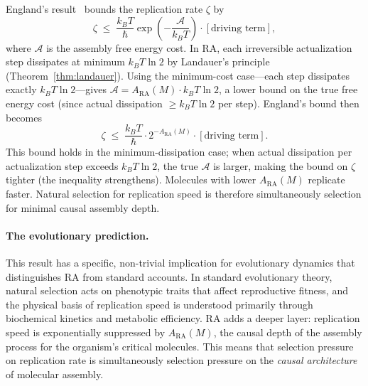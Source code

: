 \documentclass[11pt,a4paper]{article}
\theoremstyle{plain}
\theoremstyle{definition}
\theoremstyle{remark}
\newcommand{\ARA}{A_{\mathrm{RA}}}
\begin{document}
England's result~\citep{England2013} bounds the replication rate $\zeta$ by
\begin{equation}
  \zeta \;\leq\; \frac{k_{B}T}{\hbar}
  \exp\!\left(-\frac{\mathcal{A}}{k_{B}T}\right)\cdot[\text{driving term}],
\end{equation}
where $\mathcal{A}$ is the assembly free energy cost. In RA, each irreversible
actualization step dissipates at minimum $k_{B}T\ln 2$ by Landauer's principle
(Theorem~\ref{thm:landauer}). Using the minimum-cost case---each step dissipates
exactly $k_{B}T\ln 2$---gives $\mathcal{A} = \ARA(M)\cdot k_{B}T\ln 2$, a lower
bound on the true free energy cost (since actual dissipation $\geq k_{B}T\ln 2$
per step). England's bound then becomes
\begin{equation}
  \zeta \;\leq\; \frac{k_{B}T}{\hbar}
  \cdot 2^{-\ARA(M)}
  \cdot[\text{driving term}].
\end{equation}
This bound holds in the minimum-dissipation case; when actual dissipation per
actualization step exceeds $k_{B}T\ln 2$, the true $\mathcal{A}$ is larger,
making the bound on $\zeta$ tighter (the inequality strengthens).
Molecules with lower $\ARA(M)$ replicate faster. Natural selection for replication
speed is therefore simultaneously selection for minimal causal assembly depth.

\paragraph{The evolutionary prediction.}
This result has a specific, non-trivial implication for evolutionary dynamics that
distinguishes RA from standard accounts. In standard evolutionary theory, natural
selection acts on phenotypic traits that affect reproductive fitness, and the
physical basis of replication speed is understood primarily through biochemical
kinetics and metabolic efficiency. RA adds a deeper layer: replication speed is
exponentially suppressed by $\ARA(M)$, the causal depth of the assembly process
for the organism's critical molecules. This means that selection pressure on
replication rate is simultaneously selection pressure on the \emph{causal
architecture} of molecular assembly.
\end{document}
